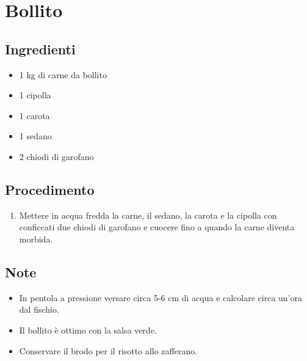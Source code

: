 \section{Bollito}
\subsection{Ingredienti}
\begin{itemize}
\item 1 kg di carne da bollito   
\item 1 cipolla  
\item 1 carota  
\item 1 sedano  
\item 2 chiodi di garofano
\end{itemize}
\subsection{Procedimento}
\begin{enumerate}
\item  Mettere in acqua fredda la carne, il sedano, la carota e la cipolla con conficcati due chiodi di garofano e cuocere fino a quando la carne diventa morbida.
\end{enumerate}
\subsection{Note}
\begin{itemize}
\item In pentola a pressione versare circa 5-6 cm di acqua e calcolare circa un'ora dal fischio.  
\item Il bollito è ottimo con la salsa verde.  
\item Conservare il brodo per il risotto allo zafferano.
\end{itemize}
